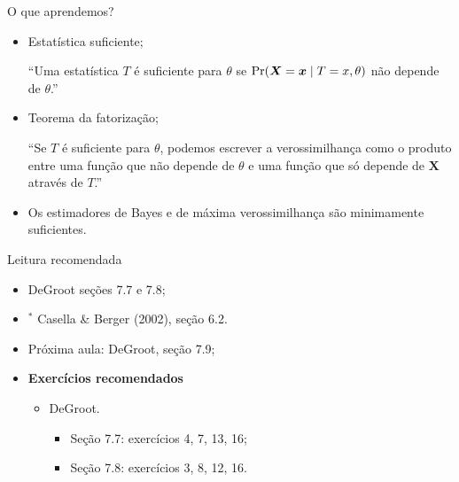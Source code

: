 \begin{frame}{O que aprendemos?}
\begin{itemize}
  \item[\faLightbulbO] Estatística suficiente;
    
    ``Uma estatística $T$ é suficiente para $\theta$ se $\operatorname{Pr}(\boldsymbol{X} = \boldsymbol{x} \mid T = x, \theta)$ não depende de $\theta$.''
    
   \item[\faLightbulbO] Teorema da fatorização;
   
   ``Se $T$ é suficiente para $\theta$, podemos escrever a verossimilhança como o produto entre uma função que não depende de $\theta$ e uma função que só depende de $\boldsymbol{X}$ através de $T$.'' 
   
     \item[\faLightbulbO] Os estimadores de Bayes e de máxima verossimilhança são minimamente suficientes.   
    
  \end{itemize}
 \end{frame}

\begin{frame}{Leitura recomendada}
\begin{itemize}
 \item[\faBook] DeGroot seções 7.7 e 7.8;
 \item[\faBook] $^\ast$ Casella \& Berger (2002), seção 6.2.
 \item[\faForward] Próxima aula: DeGroot, seção 7.9;
 \item {\large\textbf{Exercícios recomendados}}
 \begin{itemize}
  \item[\faBookmark] DeGroot.
  \begin{itemize}
   \item Seção 7.7: exercícios 4, 7, 13, 16;
   \item Seção 7.8: exercícios 3, 8, 12, 16.
  \end{itemize}   
  \end{itemize}
 \end{itemize} 
\end{frame}
